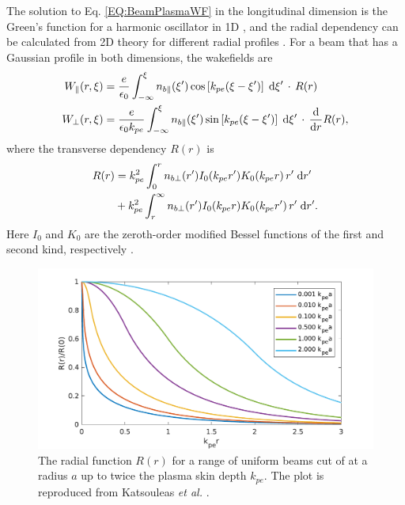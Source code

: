 The solution to Eq. \ref{EQ:BeamPlasmaWF} in the longitudinal dimension is the Green’s function for a harmonic oscillator in 1D \cite{katsouleas:1987}, and the radial dependency can be calculated from 2D theory for different radial profiles \cite{chen:1987}. For a beam that has a Gaussian profile in both dimensions, the wakefields are
\begin{align}
    W_{\parallel}(r,\xi) &= \frac{e}{\epsilon_{0}}
        \int_{-\infty}^{\xi} n_{b\parallel}(\xi^{\prime}) \cos\left[k_{pe}(\xi-\xi^{\prime})\right] \;\mathrm{d}\xi^{\prime} \,\cdot\, R(r) \label{EQ:WzFull} \\
    W_{\perp}(r,\xi) &= \frac{e}{\epsilon_{0}k_{pe}}
        \int_{-\infty}^{\xi} n_{b\parallel}(\xi^{\prime}) \sin\left[k_{pe}(\xi-\xi^{\prime})\right] \;\mathrm{d}\xi^{\prime} \,\cdot\, \frac{\mathrm{d}}{\mathrm{d}r}R(r), \label{EQ:WrFull}
\end{align}
where the transverse dependency $R(r)$ is
\begin{align}
    R(r) &= k_{pe}^{2} \int_{0}^{r} n_{b\perp}(r^{\prime}) I_{0}(k_{pe}r^{\prime})
           K_{0}(k_{pe}r) \,r^{\prime}\;\mathrm{d}r^{\prime} \nonumber \\
         &+ k_{pe}^{2} \int_{r}^{\infty} n_{b\perp}(r^{\prime}) I_{0}(k_{pe}r)
           K_{0}(k_{pe}r^{\prime}) \,r^{\prime}\;\mathrm{d}r^{\prime}. \label{EQ:WFRadial}
\end{align}
Here $I_{0}$ and $K_{0}$ are the zeroth-order modified Bessel functions of the first and second kind, respectively \cite{chen:1987,muggli:2017}.

\begin{figure}[hbt]
    \centering
    \includegraphics[width=0.70\linewidth,trim={0mm 0mm 0mm 0mm},clip]{figures/RepKatsouleas1987}
    \caption{\label{Fig:BPI:Kat87} The radial function $R(r)$ for a range of uniform beams cut of at a radius $a$ up to twice the plasma skin depth $k_{pe}$. The plot is reproduced from Katsouleas \textit{et al.} \cite{katsouleas:1987}.}
\end{figure}

